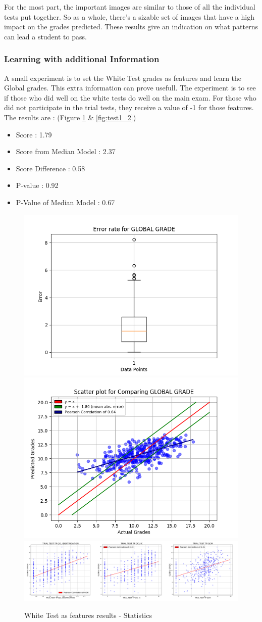 \documentclass[a4paper,11pt]{report}
\numberwithin{figure}{section} %
\begin{document}
    For the most part, the important images are similar to those of all the individual tests put together.
    So as a whole, there's a sizable set of images that have a high impact on the grades predicted.
    These results give an indication on what patterns can lead a student to pass.
    
    \subsubsection{Learning with additional Information}

    A small experiment is to set the White Test grades as features and learn the Global grades.
    This extra information can prove usefull.
    The experiment is to see if those who did well on the white tests do well on the main exam.
    For those who did not participate in the trial tests, they receive a value of -1 for those features.
    The results are : (Figure \ref{fig:test1_1} \& \ref{fig:test1_2})
    \begin{itemize}
        \item[\textbullet] Score : 1.79
        \item[\textbullet] Score from Median Model : 2.37
        \item[\textbullet] Score Difference : 0.58
        \item[\textbullet] P-value : 0.92
        \item[\textbullet] P-Value of Median Model : 0.67
    \end{itemize}
      \begin{figure}[H]
      \centering
      \includegraphics[width=.40\linewidth]{plots/test1_cv_boxplot_GLOBAL_GRADE_2018-05-17_20_39_42.png}
      \includegraphics[width=.40\linewidth]{plots/test1_cv_comp_GLOBAL_GRADE_2018-05-17_20_39_42.png}\\
      \includegraphics[width=.95\linewidth]{plots/test1_var_correlation_GLOBAL_GRADE_2018-05-17_10_12_19.png}
      \caption{White Test as features results - Statistics}
      \label{fig:test1_1}
      \end{figure}
\end{document}

